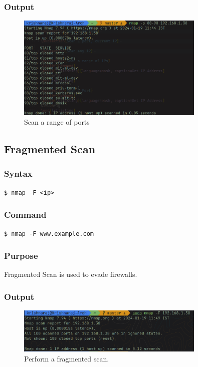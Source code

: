 \documentclass[11pt]{article}
\begin{document}
\subsubsection*{Output}
\begin{figure}[H]
    \centering
    \includegraphics[width=0.8\textwidth]{nmap range of ports.png}
    \caption{Scan a range of ports}
    \label{fig:1}
\end{figure}

\subsection{Fragmented Scan}

\subsubsection{Syntax}
\begin{verbatim}
$ nmap -F <ip>
\end{verbatim}

\subsubsection*{Command}
\begin{verbatim}
$ nmap -F www.example.com
\end{verbatim}

\subsubsection*{Purpose}
Fragmented Scan is used to evade firewalls.

\subsubsection*{Output}
\begin{figure}[H]
    \centering
    \includegraphics[width=0.8\textwidth]{nmap fragmented scan of 100 common ports.png}
    \caption{Perform a fragmented scan. }
    \label{fig:1}
\end{figure}
\end{document}
